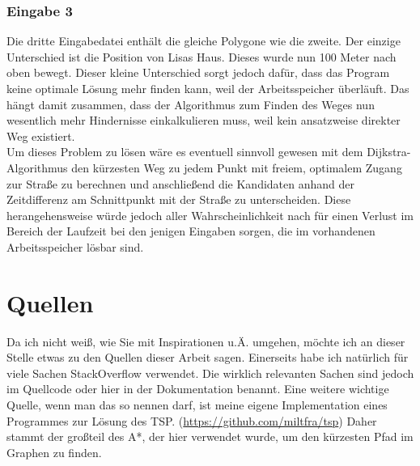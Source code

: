 \documentclass[a4paper,10pt,ngerman]{scrartcl}
\begin{document}
\subsubsection{Eingabe 3}
Die dritte Eingabedatei enthält die gleiche Polygone wie die zweite. Der einzige Unterschied ist die Position von Lisas Haus. Dieses wurde nun 100 Meter nach oben bewegt. Dieser kleine Unterschied sorgt jedoch dafür, dass das Program keine optimale Lösung mehr finden kann, weil der Arbeitsspeicher überläuft. Das hängt damit zusammen, dass der Algorithmus zum Finden des Weges nun wesentlich mehr Hindernisse einkalkulieren muss, weil kein ansatzweise direkter Weg existiert.\\
Um dieses Problem zu lösen wäre es eventuell sinnvoll gewesen mit dem Dijkstra-Algorithmus den kürzesten Weg zu jedem Punkt mit freiem, optimalem Zugang zur Straße zu berechnen und anschließend die Kandidaten anhand der Zeitdifferenz am Schnittpunkt mit der Straße zu unterscheiden. Diese herangehensweise würde jedoch aller Wahrscheinlichkeit nach für einen Verlust im Bereich der Laufzeit bei den jenigen Eingaben sorgen, die im vorhandenen Arbeitsspeicher lösbar sind.
\section{Quellen}
Da ich nicht wei\ss, wie Sie mit Inspirationen u.Ä. umgehen, möchte ich an dieser Stelle etwas zu den Quellen dieser Arbeit sagen. Einerseits habe ich natürlich für viele Sachen StackOverflow verwendet. Die wirklich relevanten Sachen sind jedoch im Quellcode oder hier in der Dokumentation benannt. Eine weitere wichtige Quelle, wenn man das so nennen darf, ist meine eigene Implementation eines Programmes zur Lösung des TSP. (\url{https://github.com/miltfra/tsp}) Daher stammt der gro\ss teil des A*, der hier verwendet wurde, um den kürzesten Pfad im Graphen zu finden. 
\end{document}
